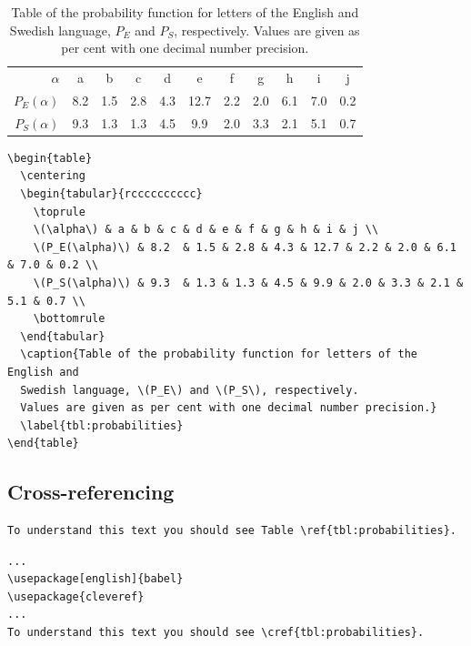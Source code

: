 \begin{frame}
\begin{table}
  \centering
  \begin{tabular}{rcccccccccc}
    \toprule
    \(\alpha\) & a & b & c & d & e & f & g & h & i & j \\
    \(P_E(\alpha)\) & 8.2  & 1.5 & 2.8 & 4.3 & 12.7 & 2.2 & 2.0 & 6.1 & 7.0 & 0.2 \\
    \(P_S(\alpha)\) & 9.3  & 1.3 & 1.3 & 4.5 & 9.9 & 2.0 & 3.3 & 2.1 & 5.1 & 0.7 \\
    \bottomrule
  \end{tabular}
  \caption{Table of the probability function for letters of the English and 
  Swedish language, \(P_E\) and \(P_S\), respectively.
  Values are given as per cent with one decimal number precision.}
  \label{tbl:probabilities}
\end{table}
\end{frame}

\begin{frame}
  \begin{lstlisting}
\begin{table}
  \centering
  \begin{tabular}{rcccccccccc}
    \toprule
    \(\alpha\) & a & b & c & d & e & f & g & h & i & j \\
    \(P_E(\alpha)\) & 8.2  & 1.5 & 2.8 & 4.3 & 12.7 & 2.2 & 2.0 & 6.1 & 7.0 & 0.2 \\
    \(P_S(\alpha)\) & 9.3  & 1.3 & 1.3 & 4.5 & 9.9 & 2.0 & 3.3 & 2.1 & 5.1 & 0.7 \\
    \bottomrule
  \end{tabular}
  \caption{Table of the probability function for letters of the English and 
  Swedish language, \(P_E\) and \(P_S\), respectively.
  Values are given as per cent with one decimal number precision.}
  \label{tbl:probabilities}
\end{table}
  \end{lstlisting}
\end{frame}


\subsection{Cross-referencing}

\begin{frame}[fragile]
  \begin{example}
    \begin{lstlisting}
To understand this text you should see Table \ref{tbl:probabilities}.
    \end{lstlisting}
    \begin{lstlisting}
...
\usepackage[english]{babel}
\usepackage{cleveref}
...
To understand this text you should see \cref{tbl:probabilities}.
    \end{lstlisting}
  \end{example}
\end{frame}


